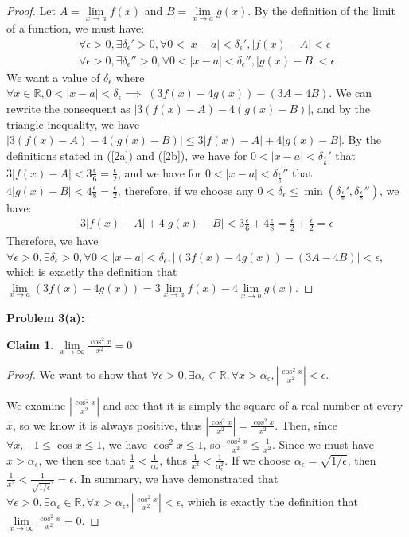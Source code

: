 \documentclass{article}
\newcommand{\reals}{\ensuremath{\mathbb{R}}}
\newcommand{\eps}{\ensuremath{\epsilon}}
\newcommand{\limx}[2]{\ensuremath{\underset{x\to #2 }{\lim} #1 (x)}}
\newcommand{\limf}[1]{\ensuremath{\underset{x\to #1 }{\lim}}}
\newtheorem{clm}{Claim}
\begin{document}
\begin{proof}
	Let $A = \limx{f}{a}$ and $B = \limx{g}{a}$.
	By the definition of the limit of a function, we must have:
	\begin{align}
		\label{2a}
		\forall \eps > 0, \exists \delta_\eps' > 0,
		\forall 0 < |x - a| < \delta_\eps', |f(x) - A| < \eps \\
		\label{2b}
		\forall \eps > 0, \exists \delta_\eps'' > 0,
		\forall 0 < |x - a| < \delta_\eps'', |g(x) - B| < \eps
	\end{align}
	We want a value of $\delta_\eps$
	where $\forall x \in \reals, 0 < | x - a| < \delta_\eps
	\implies |(3f(x) - 4g(x)) - (3A - 4B)$.
	We can rewrite the consequent
	as $|3(f(x) - A) - 4(g(x) - B)|$,
	and by the triangle inequality,
	we have 
	$|3(f(x) - A) - 4(g(x) - B)| \le 3|f(x) - A| + 4|g(x) - B|$.
	By the definitions stated in (\ref{2a}) and (\ref{2b}),
	we have for $0 < |x - a| < \delta_{\frac{\eps}{6}}'$
	that
	$3|f(x) - A| < 3 \frac{\eps}{6} = \frac{\eps}{2}$,
	and
	we have for $0 < |x - a| < \delta_{\frac{\eps}{8}}''$
	that
	$4|g(x) - B| < 4 \frac{\eps}{8} = \frac{\eps}{2}$,
	therefore,
	if we choose any $0 < \delta_\eps \le \min(\delta_\frac{\eps}{6}',\delta_\frac{\eps}{8}'')$,
	we have:
	\begin{align}
		3|f(x) - A| + 4|g(x) - B| < 3\frac{\eps}{6} + 4\frac{\eps}{8} = \frac{\eps}{2} + \frac{\eps}{2} = \eps
	\end{align}
	Therefore,
	we have
	$\forall \eps > 0,
	\exists \delta_\eps > 0,
	\forall 0 < | x - a | < \delta_\eps,
	|(3f(x) - 4g(x)) - (3A - 4B)| < \eps$,
	which is exactly the definition that
	$\underset{x \to a}{\lim} (3f(x) - 4g(x))  = 3\limx{f}{a} - 4\limx{g}{b}$.
\end{proof}

\textbf{Problem 3(a):}

\begin{clm}
	$\limf{\infty}\frac{\cos^2x}{x^2} = 0$
\end{clm}

\begin{proof}
	We want to show
	that $\forall \eps > 0,
	\exists \alpha_\eps \in \reals,
	\forall x > \alpha_\eps,
	|\frac{\cos^2x}{x^2}| < \eps$.

	We examine $|\frac{\cos^2x}{x^2}|$
	and see that it is simply
	the square of a real number at every $x$,
	so we know it is always positive,
	thus $|\frac{\cos^2x}{x^2}| = \frac{\cos^2x}{x^2}$.
	Then, since $\forall x, -1 \le \cos x \le 1$,
	we have $\cos^2x \le 1$,
	so $\frac{\cos^2x}{x^2} \le \frac{1}{x^2}$.
	Since we must have $x > \alpha_\eps$,
	we then see that $\frac{1}{x} < \frac{1}{\alpha_\eps}$,
	thus $\frac{1}{x^2} < \frac{1}{\alpha_\eps^2}$.
	If we choose $\alpha_\eps = \sqrt{1/\eps}$,
	then $\frac{1}{x^2} < \frac{1}{\sqrt{1/\eps}^2} = \eps$.
	In summary,
	we have demonstrated
	that
	$\forall \eps > 0,
	\exists \alpha_\eps \in \reals,
	\forall x > \alpha_\eps,
	|\frac{\cos^2x}{x^2}| < \eps$,
	which is exactly the definition that
	$\limf{\infty}\frac{\cos^2x}{x^2} = 0$.
\end{proof}
\end{document}
